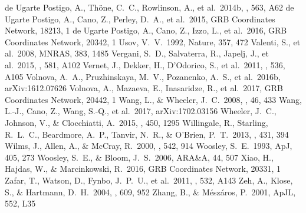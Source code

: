 \documentclass[traditabstract,longauth]{aa}
\begin{document}
\begin{thebibliography}{99}
 de Ugarte Postigo, A., Th{\"o}ne, C.~C., Rowlinson, A., et al.\ 2014b, \aap, 563, A62 
 de Ugarte Postigo, A., Cano, Z., Perley, D.~A., et al.\ 2015, GRB Coordinates Network, 18213, 1 
 de Ugarte Postigo, A., Cano, Z., Izzo, L., et al.\ 2016, GRB Coordinates Network, 20342, 1 
 Usov, V.~V.\ 1992, Nature, 357, 472
 Valenti, S., et al.\ 2008, MNRAS, 383, 1485 
 Vergani, S.~D., Salvaterra, R., Japelj, J., et al.\ 2015, \aap, 581, A102 
 Vernet, J., Dekker, H., D'Odorico, S., et al.\ 2011, \aap, 536, A105 
 Volnova, A.~A., Pruzhinskaya, M.~V., Pozanenko, A.~S., et al.\ 2016b, arXiv:1612.07626 
 Volnova, A., Mazaeva, E., Inasaridze, R., et al.\ 2017, GRB Coordinates Network, 20442, 1 
 Wang, L., \& Wheeler, J.~C.\ 2008, \araa, 46, 433 
 Wang, L.-J., Cano, Z., Wang, S.-Q., et al.\ 2017, arXiv:1702.03156 
 Wheeler, J.~C., Johnson, V., \& Clocchiatti, A.\ 2015, \mnras, 450, 1295 
 Willingale, R., Starling, R.~L.~C., Beardmore, A.~P., Tanvir, N.~R., \& O'Brien, P.~T.\ 2013, \mnras, 431, 394 
 Wilms, J., Allen, A., \& McCray, R.\ 2000, \apj, 542, 914 
 Woosley, S.~E.\ 1993, ApJ, 405, 273 
 Woosley, S.~E., \& Bloom, J.~S.\ 2006, ARA\&A, 44, 507 
 Xiao, H., Hajdas, W., \& Marcinkowski, R.\ 2016, GRB Coordinates Network, 20331, 1 
 Zafar, T., Watson, D., Fynbo, J.~P.~U., et al.\ 2011, \aap, 532, A143 
 Zeh, A., Klose, S., \& Hartmann, D.~H.\ 2004, \apj, 609, 952 
 Zhang, B., \& M{\'e}sz{\'a}ros, P.\ 2001, ApJL, 552, L35 
\end{thebibliography}
\end{document}
